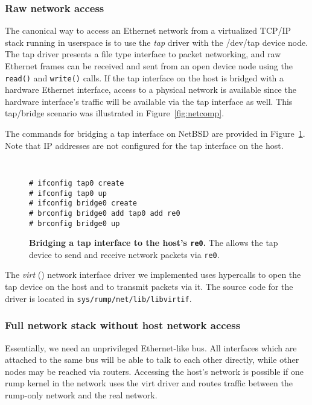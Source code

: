 \subsubsection*{Raw network access}

The canonical way to access an Ethernet network from a virtualized
TCP/IP stack running in userspace is to use the \textit{tap} driver
with the {/dev/tap} device node.  The tap driver presents a file type
interface to packet networking, and raw Ethernet frames can be
received and sent from an open device node using the \texttt{read()} and
\texttt{write()} calls.  If the tap interface on the host is bridged with
a hardware Ethernet interface, access to a physical network is available
since the hardware interface's traffic will be available via the tap
interface as well.  This tap/bridge scenario was illustrated in
Figure~\ref{fig:netcomp}.

The commands for bridging a tap interface on NetBSD are
provided in Figure~\ref{fig:tapbridgecmds}.  Note that IP addresses
are not configured for the tap interface on the host.

\begin{figure}[t]
{\tt \scriptsize
\begin{verbatim}
# ifconfig tap0 create
# ifconfig tap0 up
# ifconfig bridge0 create
# brconfig bridge0 add tap0 add re0
# brconfig bridge0 up
\end{verbatim}
}
\caption[Bridging a tap interface to the host's \texttt{re0}]{
\textbf{Bridging a tap interface to the host's \texttt{re0}.}
The allows the tap device to send and receive network packets via \texttt{re0}.
}
\label{fig:tapbridgecmds}
\end{figure}

The \textit{virt} () network interface driver
we implemented uses hypercalls to open the tap device on the
host and to transmit packets via it.  The source code for the driver is
located in \verb+sys/rump/net/lib/libvirtif+.

\subsubsection*{Full network stack without host network access}

Essentially, we need an unprivileged Ethernet-like bus.  All interfaces
which are attached to the same bus will be able to talk to each other
directly, while other nodes may be reached via routers.  Accessing the
host's network is possible if one rump kernel in the network uses the
virt driver and routes traffic between the rump-only network and the
real network.


